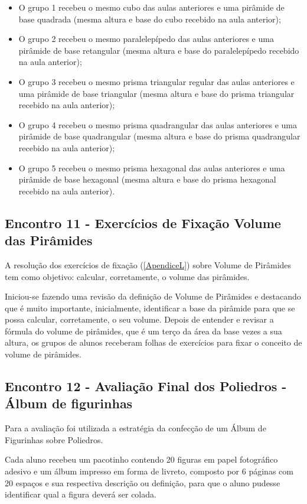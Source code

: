 \begin{itemize}
    \item O grupo 1 recebeu o mesmo cubo das aulas anteriores e uma pirâmide de base quadrada (mesma altura e base do cubo recebido na aula anterior);
    \item O grupo 2 recebeu o mesmo paralelepípedo das aulas anteriores e uma pirâmide de base retangular (mesma altura e base do paralelepípedo recebido na aula anterior);
    \item O grupo 3 recebeu o mesmo prisma triangular regular das aulas anteriores e uma pirâmide de base triangular (mesma altura e base do prisma triangular recebido na aula anterior);
    \item O grupo 4 recebeu o mesmo prisma quadrangular das aulas anteriores e uma pirâmide de base quadrangular (mesma altura e base do prisma quadrangular recebido na aula anterior);
    \item O grupo 5 recebeu o mesmo prisma hexagonal das aulas anteriores e uma pirâmide de base hexagonal (mesma altura e base do prisma hexagonal recebido na aula anterior).
\end{itemize}

\subsection{Encontro 11 - Exercícios de Fixação Volume das Pirâmides}

A resolução dos exercícios de fixação (\autoref{ApendiceL}) sobre Volume de Pirâmides tem como objetivo: calcular, corretamente, o volume das pirâmides.

Iniciou-se fazendo uma revisão da definição de Volume de Pirâmides e destacando que é muito importante, inicialmente, identificar a base da pirâmide para que se possa calcular, corretamente, o seu volume. Depois de entender e revisar a fórmula do volume de pirâmides, que é um terço da área da base vezes a sua altura, os grupos de alunos receberam folhas de exercícios para fixar o conceito de volume de pirâmides.

\subsection{Encontro 12 - Avaliação Final dos Poliedros - Álbum de figurinhas}

Para a avaliação foi utilizada a estratégia da confecção de um Álbum de Figurinhas sobre Poliedros.

Cada aluno recebeu um pacotinho contendo 20 figuras em papel fotográfico adesivo e um álbum impresso em forma de livreto, composto por 6 páginas com 20 espaços e sua respectiva descrição ou definição, para que o aluno pudesse identificar qual a figura deverá ser colada.

